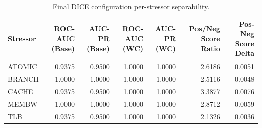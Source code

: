 \begin{table}[t]
\centering
\caption{Final DICE configuration per-stressor separability.}
\label{tab:dice_full_stressor}
\footnotesize
\begin{tabular}{lrrrrrr}
\toprule
Stressor & ROC-AUC (Base) & AUC-PR (Base) & ROC-AUC (WC) & AUC-PR (WC) & Pos/Neg Score Ratio & Pos-Neg Score Delta \\
\midrule
ATOMIC & 0.9375 & 0.9500 & 1.0000 & 1.0000 & 2.6186 & 0.0051 \\
BRANCH & 1.0000 & 1.0000 & 1.0000 & 1.0000 & 2.5116 & 0.0048 \\
CACHE & 0.9375 & 0.9500 & 1.0000 & 1.0000 & 3.3877 & 0.0076 \\
MEMBW & 1.0000 & 1.0000 & 1.0000 & 1.0000 & 2.8712 & 0.0059 \\
TLB & 0.9375 & 0.9500 & 1.0000 & 1.0000 & 2.1326 & 0.0036 \\
\bottomrule
\end{tabular}

\end{table}
